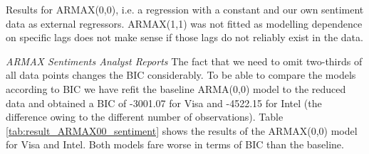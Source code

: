 \begin{table}[h!]
    \centering
    \vspace{-2ex}
    \small
    
    \vspace{1ex}
    
    \vspace{-2ex}
    \small
    
    \caption{Results for ARMAX(0,0), i.e. a regression with a constant and our own sentiment data as external regressors. ARMAX(1,1) was not fitted as modelling dependence on specific lags does not make sense if those lags do not reliably exist in the data.}
    \label{tab:result_ARMAX00_sentiment}
\end{table}{}

\textit{ARMAX Sentiments Analyst Reports}
The fact that we need to omit two-thirds of all data points changes the BIC considerably. To be able to compare the models according to BIC we have refit the baseline ARMA(0,0) model to the reduced data and obtained a BIC of -3001.07 for Visa and -4522.15 for Intel  (the difference owing to the different number of observations). Table \ref{tab:result_ARMAX00_sentiment} shows the results of the ARMAX(0,0) model for Visa and Intel. Both models fare worse in terms of BIC than the baseline. 

